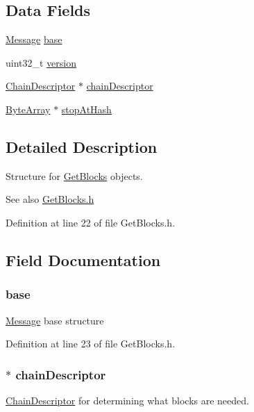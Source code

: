 \subsection*{Data Fields}
\begin{DoxyCompactItemize}
\item 
\hyperlink{struct_message}{Message} \hyperlink{struct_get_blocks_a8987f797adf70c3e174fd64cc68bc933}{base}
\item 
uint32\_\-t \hyperlink{struct_get_blocks_acd99bb05ca015e7d74448acb1deba7ca}{version}
\item 
\hyperlink{struct_chain_descriptor}{ChainDescriptor} $\ast$ \hyperlink{struct_get_blocks_a97f23aa5b4445b5d12da1efc7af9dd88}{chainDescriptor}
\item 
\hyperlink{struct_byte_array}{ByteArray} $\ast$ \hyperlink{struct_get_blocks_a86c946e52ed46a9ef9f6292c0ec68143}{stopAtHash}
\end{DoxyCompactItemize}


\subsection{Detailed Description}
Structure for \hyperlink{struct_get_blocks}{GetBlocks} objects. 

\begin{DoxySeeAlso}{See also}
\hyperlink{_get_blocks_8h}{GetBlocks.h} 
\end{DoxySeeAlso}


Definition at line 22 of file GetBlocks.h.



\subsection{Field Documentation}
\hypertarget{struct_get_blocks_a8987f797adf70c3e174fd64cc68bc933}{
\subsubsection[{base}]{ {\bf base}}}
\label{struct_get_blocks_a8987f797adf70c3e174fd64cc68bc933}
\hyperlink{struct_message}{Message} base structure 

Definition at line 23 of file GetBlocks.h.

\hypertarget{struct_get_blocks_a97f23aa5b4445b5d12da1efc7af9dd88}{
\subsubsection[{chainDescriptor}]{$\ast$ {\bf chainDescriptor}}}
\label{struct_get_blocks_a97f23aa5b4445b5d12da1efc7af9dd88}
\hyperlink{struct_chain_descriptor}{ChainDescriptor} for determining what blocks are needed. 

